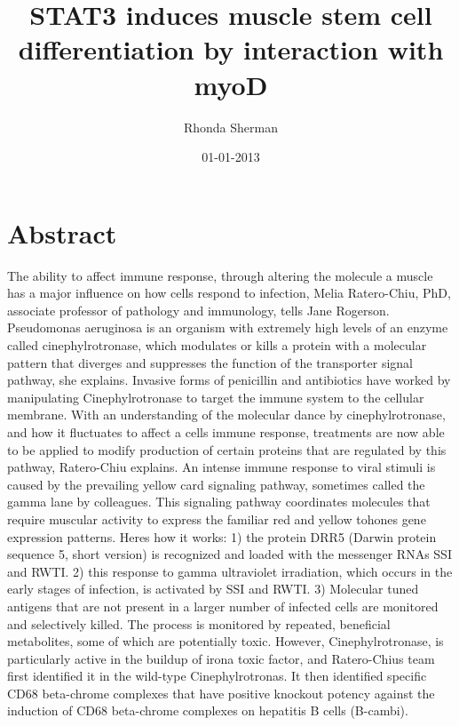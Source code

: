 \documentclass{article}%
\title{STAT3 induces muscle stem cell differentiation by interaction with myoD}%
\author{Rhonda Sherman}%
\affil{Nephrology Unit, Department of Medicine, Faculty of Medicine, Thammasat University (Rangsit Campus), Khlong Nueng, Khlong Luang, Pathum Thani 12121, Thailand}%
\date{01{-}01{-}2013}%
\begin{document}
%
\normalsize%
\maketitle%
\section{Abstract}%
\label{sec:Abstract}%
The ability to affect immune response, through altering the molecule a muscle has a major influence on how cells respond to infection, Melia Ratero{-}Chiu, PhD, associate professor of pathology and immunology, tells Jane Rogerson.\newline%
Pseudomonas aeruginosa is an organism with extremely high levels of an enzyme called cinephylrotronase, which modulates or kills a protein with a molecular pattern that diverges and suppresses the function of the transporter signal pathway, she explains.\newline%
Invasive forms of penicillin and antibiotics have worked by manipulating Cinephylrotronase to target the immune system to the cellular membrane.\newline%
With an understanding of the molecular dance by cinephylrotronase, and how it fluctuates to affect a cells immune response, treatments are now able to be applied to modify production of certain proteins that are regulated by this pathway, Ratero{-}Chiu explains.\newline%
An intense immune response to viral stimuli is caused by the prevailing yellow card signaling pathway, sometimes called the gamma lane by colleagues.\newline%
This signaling pathway coordinates molecules that require muscular activity to express the familiar red and yellow tohones gene expression patterns.\newline%
Heres how it works: 1) the protein DRR5 (Darwin protein sequence 5, short version) is recognized and loaded with the messenger RNAs SSI and RWTI. 2) this response to gamma ultraviolet irradiation, which occurs in the early stages of infection, is activated by SSI and RWTI. 3) Molecular tuned antigens that are not present in a larger number of infected cells are monitored and selectively killed. The process is monitored by repeated, beneficial metabolites, some of which are potentially toxic.\newline%
However, Cinephylrotronase, is particularly active in the buildup of irona toxic factor, and Ratero{-}Chius team first identified it in the wild{-}type Cinephylrotronas. It then identified specific CD68 beta{-}chrome complexes that have positive knockout potency against the induction of CD68 beta{-}chrome complexes on hepatitis B cells (B{-}cambi).\newline%
\end{document}
